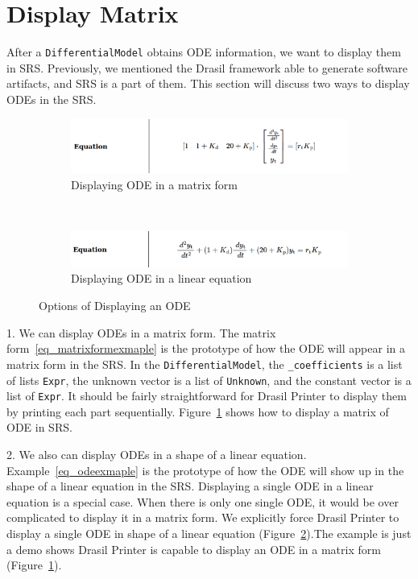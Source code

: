 \section{Display Matrix}
After a \verb|DifferentialModel| obtains ODE information, we want to display them in SRS. Previously, we mentioned the Drasil framework able to generate software artifacts, and SRS is a part of them. This section will discuss two ways to display ODEs in the SRS.

\begin{figure}[ht]
	\centering
	\begin{subfigure}[t]{\textwidth}
		\centering
		
\includegraphics[width=1\textwidth]{figures/ODEInMatrix.png}
		\caption{Displaying ODE in a matrix form}
		\label{fig_multienv_odematrix}
	\end{subfigure}
	~
	\begin{subfigure}[t]{\textwidth}
		\centering
	
\includegraphics[width=1\textwidth]{figures/ODEInLinearEq.png}
		\caption{Displaying ODE in a linear equation}
		\label{fig_multienv_odelinear}
	\end{subfigure}
	
	\caption{Options of Displaying an ODE}
	\label{fig_multienv}
\end{figure}

1. We can display ODEs in a matrix form. The matrix form~\ref{eq_matrixformexmaple} is the prototype of how the ODE will appear in a matrix form in the SRS. In the \verb|DifferentialModel|, the \verb|_coefficients| is a list of lists \verb|Expr|, the unknown vector is a list of \verb|Unknown|, and the constant vector is a list of \verb|Expr|. It should be fairly straightforward for Drasil Printer to display them by printing each part sequentially. Figure~\ref{fig_multienv_odematrix} shows how to display a matrix of ODE in SRS. 

2. We also can display ODEs in a shape of a linear equation. Example~\ref{eq_odeexmaple} is the prototype of how the ODE will show up in the shape of a linear equation in the SRS. Displaying a single ODE in a linear equation is a special case. When there is only one single ODE, it would be over complicated to display it in a matrix form. We explicitly force Drasil Printer to display a single ODE in shape of a linear equation (Figure~\ref{fig_multienv_odelinear}).The example is just a demo shows Drasil Printer is capable to display an ODE in a matrix form (Figure~\ref{fig_multienv_odematrix}).


